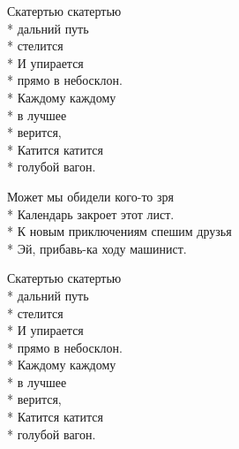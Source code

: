 \medskip

\begin{minipage}{\linewidth}
\hspace*{1.5em}Скатертью скатертью\\*
\hspace*{1.5em}дальний путь\\*
\hspace*{1.5em}стелится\\*
\hspace*{1.5em}И упирается\\*
\hspace*{1.5em}прямо в небосклон.\\*
\hspace*{1.5em}Каждому каждому\\*
\hspace*{1.5em}в лучшее\\*
\hspace*{1.5em}верится,\\*
\hspace*{1.5em}Катится катится\\*
\hspace*{1.5em}голубой вагон.\\
\end{minipage}\par\medskip\nobreak

\medskip

\begin{minipage}{\linewidth}
Может мы обидели кого-то зря\\*
Календарь закроет этот лист.\\*
К новым приключениям спешим друзья\\*
Эй, прибавь-ка ходу машинист.\\
\end{minipage}\par\medskip\nobreak

\medskip

\begin{minipage}{\linewidth}
\hspace*{1.5em}Скатертью скатертью\\*
\hspace*{1.5em}дальний путь\\*
\hspace*{1.5em}стелится\\*
\hspace*{1.5em}И упирается\\*
\hspace*{1.5em}прямо в небосклон.\\*
\hspace*{1.5em}Каждому каждому\\*
\hspace*{1.5em}в лучшее\\*
\hspace*{1.5em}верится,\\*
\hspace*{1.5em}Катится катится\\*
\hspace*{1.5em}голубой вагон.\\
\end{minipage}\par\medskip\nobreak

